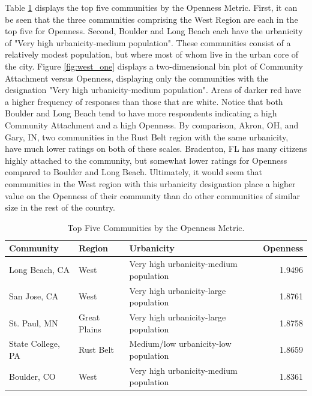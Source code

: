 \documentclass[11pt]{article}\usepackage{knitr}
\begin{document}
Table \ref{tbl:open_table} displays the top five communities by the Openness Metric. First, it can be seen that the three communities comprising the West Region are each in the top five for Openness. Second, Boulder and Long Beach each have the urbanicity of "Very high urbanicity-medium population". These communities consist of a relatively modest population, but where most of whom live in the urban core of the city. Figure \ref{fig:west_one} displays a two-dimensional bin plot of Community Attachment versus Openness, displaying only the communities with the designation "Very high urbanicity-medium population". Areas of darker red have a higher frequency of responses than those that are white. Notice that both Boulder and Long Beach tend to have more respondents indicating a high Community Attachment and a high Openness. By comparison, Akron, OH, and Gary, IN, two communities in the Rust Belt region with the same urbanicity, have much lower ratings on both of these scales. Bradenton, FL has many citizens highly attached to the community, but somewhat lower ratings for Openness compared to Boulder and Long Beach. Ultimately, it would seem that communities in the West region with this urbanicity designation place a higher value on the Openness of their community than do other communities of similar size in the rest of the country.

\begin{table}[ht]
\centering
\begin{tabular}{lllr}
  \hline
Community & Region & Urbanicity & Openness \\ 
  \hline
Long Beach, CA & West & Very high urbanicity-medium population & 1.9496 \\ 
  San Jose, CA & West & Very high urbanicity-large population & 1.8761 \\ 
  St. Paul, MN & Great Plains & Very high urbanicity-large population & 1.8758 \\ 
  State College, PA & Rust Belt & Medium/low urbanicity-low population & 1.8659 \\ 
  Boulder, CO & West & Very high urbanicity-medium population & 1.8361 \\ 
   \hline
\end{tabular}
\caption{Top Five Communities by the Openness Metric.} 
\label{tbl:open_table}
\end{table}
\end{document}
